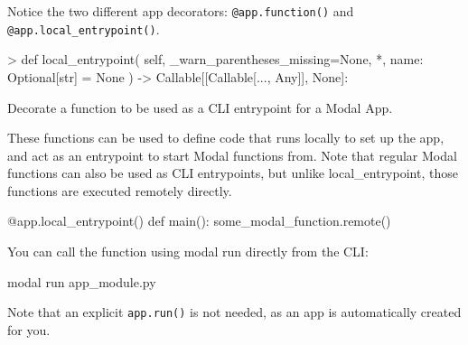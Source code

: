 \documentclass[
  letterpaper,
  DIV=11,
  numbers=noendperiod]{scrreprt}
\newenvironment{Shaded}{\begin{snugshade}}{\end{snugshade}}
\newcommand{\AttributeTok}[1]{\textcolor[rgb]{0.40,0.45,0.13}{#1}}
\newcommand{\BuiltInTok}[1]{\textcolor[rgb]{0.00,0.23,0.31}{#1}}
\newcommand{\ExtensionTok}[1]{\textcolor[rgb]{0.00,0.23,0.31}{#1}}
\newcommand{\KeywordTok}[1]{\textcolor[rgb]{0.00,0.23,0.31}{#1}}
\newcommand{\NormalTok}[1]{\textcolor[rgb]{0.00,0.23,0.31}{#1}}
\newcommand{\OperatorTok}[1]{\textcolor[rgb]{0.37,0.37,0.37}{#1}}
\newcommand{\VariableTok}[1]{\textcolor[rgb]{0.07,0.07,0.07}{#1}}
\begin{document}
Notice the two different app decorators: \texttt{@app.function()} and
\texttt{@app.local\_entrypoint()}.

\begin{tcolorbox}[enhanced jigsaw, rightrule=.15mm, leftrule=.75mm, coltitle=black, left=2mm, colbacktitle=quarto-callout-note-color!10!white, colback=white, opacityback=0, toprule=.15mm, toptitle=1mm, colframe=quarto-callout-note-color-frame, breakable, arc=.35mm, bottomtitle=1mm, title=\textcolor{quarto-callout-note-color}{\faInfo}\hspace{0.5em}{From the docs, a
\href{https://modal.com/docs/reference/modal.App\#local_entrypoint}{\texttt{local\_entrypoint}}:}, titlerule=0mm, bottomrule=.15mm, opacitybacktitle=0.6]

\begin{Shaded}
\begin{Highlighting}[]
\OperatorTok{\textgreater{}} \KeywordTok{def}\NormalTok{ local\_entrypoint(}
    \VariableTok{self}\NormalTok{, \_warn\_parentheses\_missing}\OperatorTok{=}\VariableTok{None}\NormalTok{, }\OperatorTok{*}\NormalTok{, name: Optional[}\BuiltInTok{str}\NormalTok{] }\OperatorTok{=} \VariableTok{None}
\NormalTok{) }\OperatorTok{{-}\textgreater{}}\NormalTok{ Callable[[Callable[..., Any]], }\VariableTok{None}\NormalTok{]:}
\end{Highlighting}
\end{Shaded}

Decorate a function to be used as a CLI entrypoint for a Modal App.

These functions can be used to define code that runs locally to set up
the app, and act as an entrypoint to start Modal functions from. Note
that regular Modal functions can also be used as CLI entrypoints, but
unlike local\_entrypoint, those functions are executed remotely
directly.

\begin{Shaded}
\begin{Highlighting}[]
\AttributeTok{@app.local\_entrypoint}\NormalTok{()}
\KeywordTok{def}\NormalTok{ main():}
\NormalTok{    some\_modal\_function.remote()}
\end{Highlighting}
\end{Shaded}

You can call the function using modal run directly from the CLI:

\begin{Shaded}
\begin{Highlighting}[]
\ExtensionTok{modal}\NormalTok{ run app\_module.py}
\end{Highlighting}
\end{Shaded}

Note that an explicit \texttt{app.run()} is not needed, as an app is
automatically created for you.

\end{tcolorbox}
\end{document}
